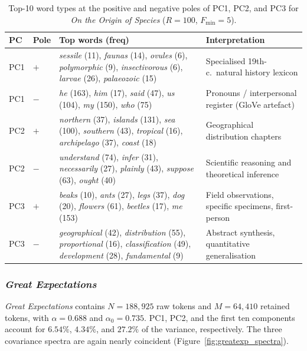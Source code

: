 \documentclass[12pt,a4paper]{article}
\begin{document}
\begin{table}[htbp]
\centering
\caption{Top-10 word types at the positive and negative poles
of PC1, PC2, and PC3 for \emph{On the Origin of Species}
($R=100$, $F_{\min}=5$).}
\label{tab:darwin_pc}
\small
\setlength{\tabcolsep}{4pt}
\begin{tabular}{ll p{6cm} p{5.5cm}}
\toprule
PC & Pole & Top words (freq) & Interpretation \\
\midrule
PC1 & $+$ &
  \emph{sessile} (11), \emph{faunas} (14), \emph{ovules} (6),
  \emph{polymorphic} (9), \emph{insectivorous} (6),
  \emph{larvae} (26), \emph{palaeozoic} (15)
  & Specialised 19th-c.\ natural history lexicon \\
PC1 & $-$ &
  \emph{he} (163), \emph{him} (17), \emph{said} (47),
  \emph{us} (104), \emph{my} (150), \emph{who} (75)
  & Pronouns / interpersonal register (GloVe artefact) \\
\midrule
PC2 & $+$ &
  \emph{northern} (37), \emph{islands} (131), \emph{sea} (100),
  \emph{southern} (43), \emph{tropical} (16),
  \emph{archipelago} (37), \emph{coast} (18)
  & Geographical distribution chapters \\
PC2 & $-$ &
  \emph{understand} (74), \emph{infer} (31),
  \emph{necessarily} (27), \emph{plainly} (43),
  \emph{suppose} (63), \emph{ought} (40)
  & Scientific reasoning and theoretical inference \\
\midrule
PC3 & $+$ &
  \emph{beaks} (10), \emph{ants} (27), \emph{legs} (37),
  \emph{dog} (20), \emph{flowers} (61),
  \emph{beetles} (17), \emph{me} (153)
  & Field observations, specific specimens, first-person \\
PC3 & $-$ &
  \emph{geographical} (42), \emph{distribution} (55),
  \emph{proportional} (16), \emph{classification} (49),
  \emph{development} (28), \emph{fundamental} (9)
  & Abstract synthesis, quantitative generalisation \\
\bottomrule
\end{tabular}
\end{table}

\subsubsection{\emph{Great Expectations}}
\label{sec:greatexp}

\emph{Great Expectations} contains $N=188{,}925$ raw tokens and
$M=64{,}410$ retained tokens, with $\alpha=0.688$ and
$\alpha_0=0.735$. PC1, PC2, and the first ten components account for
$6.54\%$, $4.34\%$, and $27.2\%$ of the variance, respectively. The
three covariance spectra are again nearly coincident
(Figure~\ref{fig:greatexp_spectra}).
\end{document}
